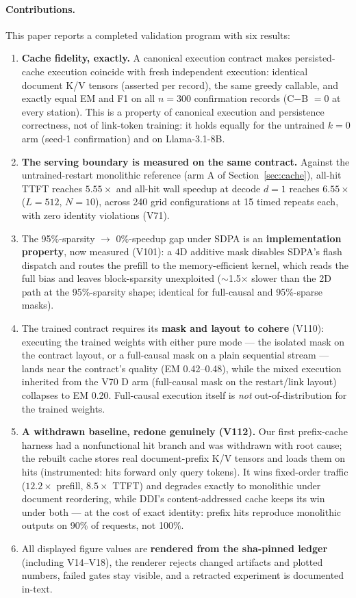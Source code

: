 \paragraph{Contributions.}
This paper reports a completed validation program with six results:
\begin{enumerate}
\item \textbf{Cache fidelity, exactly.} A canonical execution contract makes
persisted-cache execution coincide with fresh independent execution:
identical document K/V tensors (asserted per record), the same greedy
callable, and exactly equal EM and F1 on all $n{=}300$ confirmation records
(C$-$B $=0$ at every station). This is a property of canonical execution and
persistence correctness, not of link-token training: it holds equally for the
untrained $k{=}0$ arm (seed-1 confirmation) and on Llama-3.1-8B.
\item \textbf{The serving boundary is measured on the same contract.} Against
the untrained-restart monolithic reference (arm A of
Section~\ref{sec:cache}), all-hit TTFT reaches $5.55\times$ and all-hit
wall speedup at decode $d{=}1$ reaches $6.55\times$ ($L{=}512$, $N{=}10$),
across 240 grid configurations at 15 timed repeats each, with zero identity
violations (V71).
\item The 95\%-sparsity $\to$ 0\%-speedup gap under SDPA is an
\textbf{implementation property}, now measured (V101): a 4D additive mask
disables SDPA's flash dispatch and routes the prefill to the
memory-efficient kernel, which reads the full bias and leaves block-sparsity
unexploited ($\sim$1.5$\times$ slower than the 2D path at the 95\%-sparsity
shape; identical for full-causal and 95\%-sparse masks).
\item The trained contract requires its \textbf{mask and layout to cohere}
(V110): executing the trained weights with either pure mode --- the isolated
mask on the contract layout, or a full-causal mask on a plain sequential
stream --- lands near the contract's quality (EM 0.42--0.48), while the
mixed execution inherited from the V70 D arm (full-causal mask on the
restart/link layout) collapses to EM 0.20. Full-causal execution itself is
\emph{not} out-of-distribution for the trained weights.
\item \textbf{A withdrawn baseline, redone genuinely (V112).} Our first
prefix-cache harness had a nonfunctional hit branch and was withdrawn with
root cause; the rebuilt cache stores real document-prefix K/V tensors and
loads them on hits (instrumented: hits forward only query tokens). It wins
fixed-order traffic ($12.2\times$ prefill, $8.5\times$ TTFT) and degrades
exactly to monolithic under document reordering, while DDI's
content-addressed cache keeps its win under both --- at the cost of exact
identity: prefix hits reproduce monolithic outputs on 90\% of requests, not
100\%.
\item All displayed figure values are \textbf{rendered from the sha-pinned
ledger} (including V14--V18), the renderer rejects changed artifacts and
plotted numbers, failed gates stay visible, and a retracted experiment is
documented in-text.
\end{enumerate}


